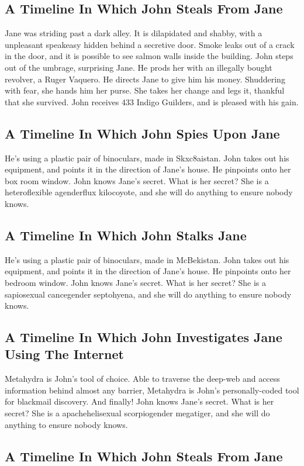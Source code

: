 \documentclass{article}
\begin{document}
\subsection{A Timeline In Which John Steals From Jane}


Jane was striding past a dark alley.
It is dilapidated and shabby, with a unpleasant speakeasy hidden behind a secretive door.
Smoke leaks out of a crack in the door, and it is possible to see salmon walls inside the building.
John steps out of the umbrage, surprising Jane.
He prods her with an illegally bought revolver, a Ruger Vaquero.
He directs Jane to give him his money.
Shuddering with fear, she hands him her purse.
She takes her change and legs it, thankful that she survived.
John receives 433 Indigo Guilders, and is pleased with his gain.
\subsection{A Timeline In Which John Spies Upon Jane}


He's using a plastic pair of binoculars, made in Skxc8aistan.
John takes out his equipment, and points it in the direction of Jane's house. He pinpoints onto her box room window.
John knows Jane's secret. What is her secret? She is a heteroflexible agenderflux kilocoyote, and she will do anything to ensure nobody knows.
\subsection{A Timeline In Which John Stalks Jane}


He's using a plastic pair of binoculars, made in McBekistan.
John takes out his equipment, and points it in the direction of Jane's house. He pinpoints onto her bedroom window.
John knows Jane's secret. What is her secret? She is a sapiosexual cancegender septohyena, and she will do anything to ensure nobody knows.
\subsection{A Timeline In Which John Investigates Jane Using The Internet}


Metahydra is John's tool of choice. Able to traverse the deep{-}web and access information behind almost any barrier, Metahydra is John's personally{-}coded tool for blackmail discovery.
And finally!
John knows Jane's secret. What is her secret? She is a apachehelisexual scorpiogender megatiger, and she will do anything to ensure nobody knows.
\subsection{A Timeline In Which John Steals From Jane}
\end{document}
